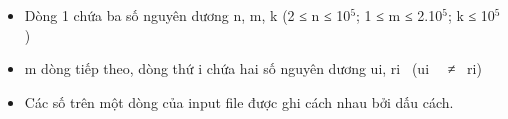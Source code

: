 \begin{itemize}
	\item Dòng 1 chứa ba số nguyên dương n, m, k (2 ≤ n ≤ 10$^5$; 1 ≤ m ≤ 2.10$^5$; k ≤ 10$^5$)
	\item m dòng tiếp theo, dòng thứ i chứa hai số nguyên dương ui, ri  (ui   ≠  ri)
	\item Các số trên một dòng của input file được ghi cách nhau bởi dấu cách.
\end{itemize}